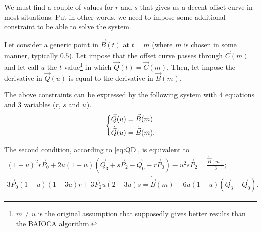 \documentclass{scrartcl}
\newcommand\V[1]{\vec{#1}}
\newcommand\D[1]{\dot{#1}}
\newcommand\DV[1]{\D{\V{#1}}}
\begin{document}
We must find a couple of values for $r$ and $s$ that gives us a decent
offset curve in most situations. Put in other words, we need to impose
some additional constraint to be able to solve the system.

Let consider a generic point in $\V{B}(t)$ at $t=m$ (where $m$ is chosen
in some manner, typically $0.5$). Let impose that the offset curve passes
through $\V{C}(m)$ and let call $u$ the $t$ value\footnote{$m \neq u$
is the original assumption that supposedly gives better results than the
BAIOCA algorithm.} in which $\V{Q}(t) = \V{C}(m)$. Then, let impose the
derivative in $\V{Q}(u)$ is equal to the derivative in $\V{B}(m)$.

The above constraints can be expressed by the following system with 4
equations and 3 variables ($r$, $s$ and $u$).
\begin{equation*}
\begin{dcases}
    \V{Q}(u) = \V{B}(m)\\
    \DV{Q}(u) = \DV{B}(m).
\end{dcases}
\end{equation*}

The second condition, according to \eqref{eq:QD}, is equivalent to
\begin{equation*}
\begin{aligned}
    (1-u)^2 r \V{P}_0 +
	2u(1-u) (\V{Q}_3 + s \V{P}_2 - \V{Q}_0 - r \V{P}_0) -
	u^2 s \V{P}_2 =
	\frac{\DV{B}(m)}{3}; \\
    3 \V{P}_0 (1-u)(1-3u) r + 3 \V{P}_2 u(2-3u) s =
	\DV{B}(m) - 6u(1-u) (\V{Q}_3 - \V{Q}_0).
\end{aligned}
\end{equation*}
\end{document}
